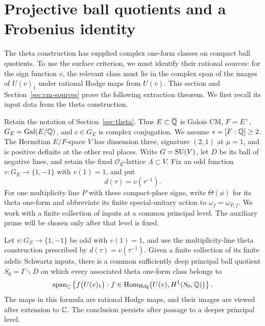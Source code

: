 \section{Projective ball quotients and a Frobenius identity}\label{sec:arithmetic}

The theta construction has supplied complex one-form classes on compact
ball quotients.  To use the surface criterion, we must identify their
rational sources: for the sign function \(v\), the relevant class must
lie in the complex span of the images of \(U(v)_1\) under rational Hodge
maps from \(U(v)\).  This section and Section~\ref{sec:cm-sources}
prove the following extraction theorem.  We first recall its input
data from the theta construction.

Retain the notation of Section~\ref{sec:theta}.  Thus \(E\subset\overline{\mathbb{Q}}\)
is Galois CM, \(F=E^+\), \(G_E=\operatorname{Gal}(E/\mathbb{Q})\), and \(c\in G_E\) is
complex conjugation.  We assume \(s=[F:\mathbb{Q}]\geq2\).  The Hermitian
\(E/F\)-space \(V\) has dimension three, signature \((2,1)\) at
\(\mu=1\), and is positive definite at the other real places.
Write \(G=\operatorname{SU}(V)\), let \(D\) be its ball of negative lines, and retain
the fixed \(\mathcal O_E\)-lattice \(\Lambda\subset V\).  Fix an odd
function \(v:G_E\to\{1,-1\}\) with \(v(1)=1\), and put
\[
d(\tau)=v(\tau^{-1}).
\]
For one multiplicity line \(P\) with these compact-place signs, write
\(\Theta(\phi)\) for its theta one-form and abbreviate its finite
special-unitary action to \(\omega_f=\omega_{P,f}\).  We work with a
finite collection of inputs at a common principal level.  The auxiliary
prime will be chosen only after that level is fixed.

\begin{theorem}\label{thm:cm-extraction}
Let \(v:G_E\to\{1,-1\}\) be odd with \(v(1)=1\), and use the
multiplicity-line theta construction prescribed by
\(d(\tau)=v(\tau^{-1})\). Given a finite collection of its finite
adelic Schwartz inputs, there is a common sufficiently deep principal
ball quotient \(S_0=\Gamma\backslash D\) on which every associated
theta one-form class belongs to
\begin{equation}\label{eq:cm-extraction-span}
\operatorname{span}_{\mathbb{C}}\left\{
f\bigl(U(v)_1\bigr):
f\in\operatorname{Hom}_{\mathrm{Hdg}}\bigl(U(v),H^1(S_0,\mathbb{Q})\bigr)
\right\}.
\end{equation}
The maps in this formula are rational Hodge maps, and their images
are viewed after extension to \(\mathbb{C}\). The conclusion persists after
passage to a deeper principal level.
\end{theorem}

